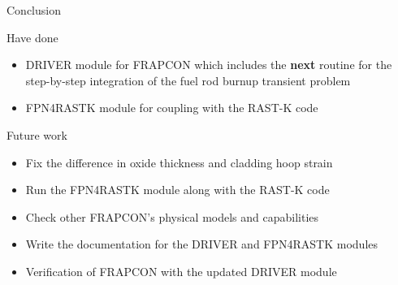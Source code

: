 \documentclass[11pt]{beamer}
\begin{document}
\begin{frame}{Conclusion}
  \footnotesize 

  \begin{block}{Have done}
  \begin{itemize}
  \item DRIVER module for FRAPCON which includes the \textbf{next} routine for the step-by-step integration of the fuel rod burnup transient problem
  \item FPN4RASTK module for coupling with the RAST-K code
  \end{itemize}
  \end{block}
  
  \begin{block}{Future work}
  \begin{itemize}
  \item Fix the difference in oxide thickness and cladding hoop strain
  \item Run the FPN4RASTK module along with the RAST-K code
  \item Check other FRAPCON's physical models and capabilities
  \item Write the documentation for the DRIVER and FPN4RASTK modules 
  \item Verification of FRAPCON with the updated DRIVER module
  \end{itemize}
  \end{block}

\end{frame}
\end{document}
